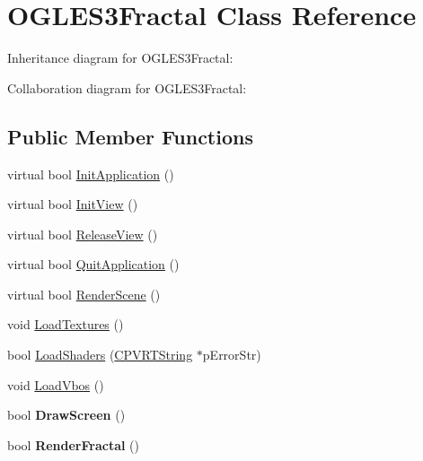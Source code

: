 \hypertarget{class_o_g_l_e_s3_fractal}{\section{O\+G\+L\+E\+S3\+Fractal Class Reference}
\label{class_o_g_l_e_s3_fractal}
}


Inheritance diagram for O\+G\+L\+E\+S3\+Fractal\+:


Collaboration diagram for O\+G\+L\+E\+S3\+Fractal\+:
\subsection*{Public Member Functions}
\begin{DoxyCompactItemize}
\item 
virtual bool \hyperlink{class_o_g_l_e_s3_fractal_aa0be659909efed9eb2ef1cf3144b1c9f}{Init\+Application} ()
\item 
virtual bool \hyperlink{class_o_g_l_e_s3_fractal_a2f8056dcdc3fd9c7c3ee80f105c4dfaa}{Init\+View} ()
\item 
virtual bool \hyperlink{class_o_g_l_e_s3_fractal_a7a323b0fee15df3cdc5425b1501c47e2}{Release\+View} ()
\item 
virtual bool \hyperlink{class_o_g_l_e_s3_fractal_a5ea87ef9e6a80eab367c39ac0cd50202}{Quit\+Application} ()
\item 
virtual bool \hyperlink{class_o_g_l_e_s3_fractal_afc27e89dc1b1cbf50cec0a75502fabc9}{Render\+Scene} ()
\item 
void \hyperlink{class_o_g_l_e_s3_fractal_af0d9003400d78d7baa1ba05eb541cc6f}{Load\+Textures} ()
\item 
bool \hyperlink{class_o_g_l_e_s3_fractal_a5fcb07ca5d953ed9731d8001738fb3a2}{Load\+Shaders} (\hyperlink{class_c_p_v_r_t_string}{C\+P\+V\+R\+T\+String} $\ast$p\+Error\+Str)
\item 
void \hyperlink{class_o_g_l_e_s3_fractal_adab113a5223fce7d281bcaf2df316708}{Load\+Vbos} ()
\item 
\hypertarget{class_o_g_l_e_s3_fractal_a32eed6ea51ca3ac65a59ab9e3a8d3c4d}{bool {\bfseries Draw\+Screen} ()}\label{class_o_g_l_e_s3_fractal_a32eed6ea51ca3ac65a59ab9e3a8d3c4d}

\item 
\hypertarget{class_o_g_l_e_s3_fractal_a292a2116abfb046339b9ed8cc3c1e1bb}{bool {\bfseries Render\+Fractal} ()}\label{class_o_g_l_e_s3_fractal_a292a2116abfb046339b9ed8cc3c1e1bb}

\end{DoxyCompactItemize}


